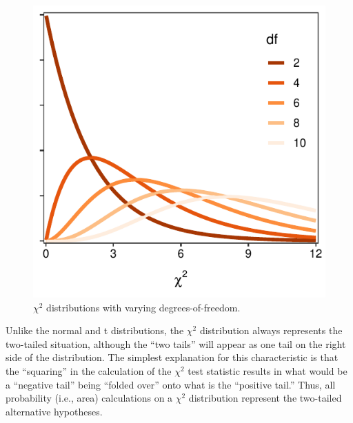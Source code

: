 \documentclass[10pt,openany]{book}\usepackage[]{graphicx}\usepackage[]{color}
\newenvironment{knitrout}{}{} %
\begin{document}
\begin{knitrout}
\color{fgcolor}\begin{figure}[hbtp]

{\centering \includegraphics[width=.4\linewidth]{Figs/chiDist-1} 

}

\caption[$\chi^2$ distributions with varying degrees-of-freedom]{$\chi^2$ distributions with varying degrees-of-freedom.}\label{fig:chiDist}
\end{figure}


\end{knitrout}

Unlike the normal and t distributions, the $\chi^2$ distribution always represents the two-tailed situation, although the ``two tails'' will appear as one tail on the right side of the distribution. The simplest explanation for this characteristic is that the ``squaring'' in the calculation of the $\chi^{2}$ test statistic results in what would be a ``negative tail'' being ``folded over'' onto what is the ``positive tail.''  Thus, all probability (i.e., area) calculations on a $\chi^{2}$ distribution represent the two-tailed alternative hypotheses.
\end{document}
